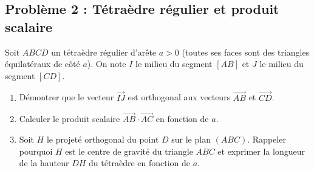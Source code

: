 \subsection*{Problème 2 : Tétraèdre régulier et produit scalaire}
Soit $ABCD$ un tétraèdre régulier d'arête $a > 0$ (toutes ses faces sont des triangles équilatéraux de côté $a$). On note $I$ le milieu du segment $[AB]$ et $J$ le milieu du segment $[CD]$.
\begin{enumerate}
    \item Démontrer que le vecteur $\vec{IJ}$ est orthogonal aux vecteurs $\vec{AB}$ et $\vec{CD}$.
    \item Calculer le produit scalaire $\vec{AB} \cdot \vec{AC}$ en fonction de $a$.
    \item Soit $H$ le projeté orthogonal du point $D$ sur le plan $(ABC)$. Rappeler pourquoi $H$ est le centre de gravité du triangle $ABC$ et exprimer la longueur de la hauteur $DH$ du tétraèdre en fonction de $a$.
\end{enumerate}

